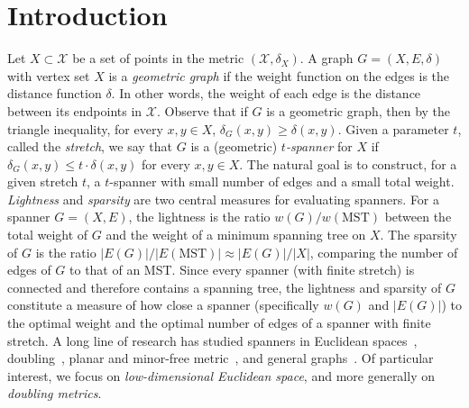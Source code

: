 \documentclass[11pt]{article}
\def\EMPH#1{\emph{\textcolor{BrickRed} {#1}}}
\newcommand{\cX}{\mathcal{X}}
\newcommand{\dist}{\ensuremath{\delta}}
\begin{document}
\section{Introduction}
Let $X\subset \cX$ be a set of points in the metric $(\cX,\delta_X)$. A graph $G= (X,E,\delta)$ with vertex set $X$ is a \EMPH{geometric graph} if the weight function on the edges is the distance function $\delta$. In other words, the weight of each edge is the distance between its endpoints in $\cX$. Observe that if $G$ is a geometric graph, then by the triangle inequality, for every $x,y\in X$, $\delta_G(x,y)\geq \delta(x,y)$.  Given a parameter $t$, called the \EMPH{stretch}, we say that  $G$ is a (geometric) \EMPH{$t$-spanner} for $X$ if $\dist_G(x,y)\leq t\cdot \delta(x,y)$ for every $x,y\in X$. The natural goal is to construct, for a given stretch $t$, a $t$-spanner with small number of edges and a small total weight.
%
\EMPH{Lightness} and \EMPH{sparsity} are two central measures for evaluating spanners. For a spanner $G=(X,E)$, the lightness is the ratio $w(G)/w(\mathrm{MST})$ between the total weight of $G$ and the weight of a minimum spanning tree on $X$. The sparsity of $G$ is the ratio $|E(G)|/|E(\mathrm{MST})| \approx |E(G)|/|X|$, comparing the number of edges of $G$ to that of an MST. 
Since every spanner (with finite stretch) is connected and therefore contains a spanning tree, the lightness and sparsity of $G$ 
constitute a measure of how close a spanner (specifically $w(G)$ and $|E(G)|$) to the optimal weight and the optimal number of edges of a spanner with finite stretch.
A long line of research has studied spanners in Euclidean spaces~\cite{arya1995euclidean, rao1998approximating,HarPeledIS13,
 ElkinS15,FiltserN22,BhoreT22,LeS25}, doubling~\cite{gao2004deformable,chan2009small,smid2009weak, gottlieb2015light, FS20, BLW19, BhoreM25}, planar and minor-free metric~\cite{borradaile2017minor, grigni2002light, cohen2020light, BhoreKK0LPT25}, and general graphs~\cite{peleg1989graph,althofer1993sparse,ElkinS16,ElkinNS15,chechik2018near,FS20,LeS23,Bodwin24}. 
Of particular interest, we focus on \emph{low-dimensional Euclidean space}, and more generally on \emph{doubling metrics}. 
%
%
%
\end{document}
